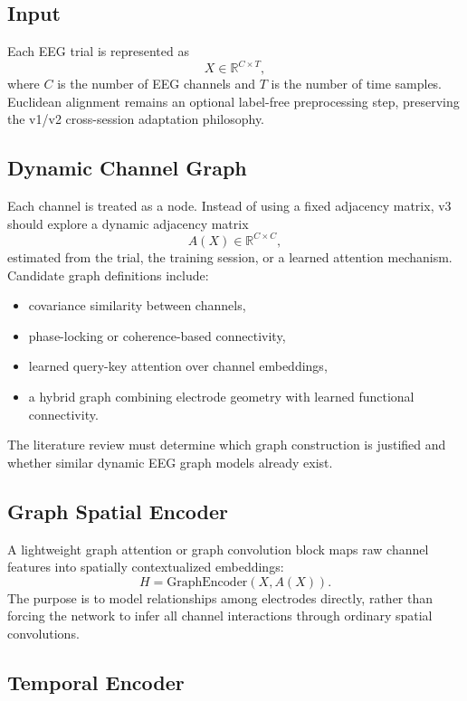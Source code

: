 \documentclass[11pt]{article}
\begin{document}
\subsection{Input}

Each EEG trial is represented as
\[
  X \in \mathbb{R}^{C \times T},
\]
where \(C\) is the number of EEG channels and \(T\) is the number of time
samples. Euclidean alignment remains an optional label-free preprocessing
step, preserving the v1/v2 cross-session adaptation philosophy.

\subsection{Dynamic Channel Graph}

Each channel is treated as a node. Instead of using a fixed adjacency matrix,
v3 should explore a dynamic adjacency matrix
\[
  A(X) \in \mathbb{R}^{C \times C},
\]
estimated from the trial, the training session, or a learned attention
mechanism. Candidate graph definitions include:
\begin{itemize}
  \item covariance similarity between channels,
  \item phase-locking or coherence-based connectivity,
  \item learned query-key attention over channel embeddings,
  \item a hybrid graph combining electrode geometry with learned functional
  connectivity.
\end{itemize}
The literature review must determine which graph construction is justified and
whether similar dynamic EEG graph models already exist.

\subsection{Graph Spatial Encoder}

A lightweight graph attention or graph convolution block maps raw channel
features into spatially contextualized embeddings:
\[
  H = \mathrm{GraphEncoder}(X, A(X)).
\]
The purpose is to model relationships among electrodes directly, rather than
forcing the network to infer all channel interactions through ordinary spatial
convolutions.

\subsection{Temporal Encoder}
\end{document}
